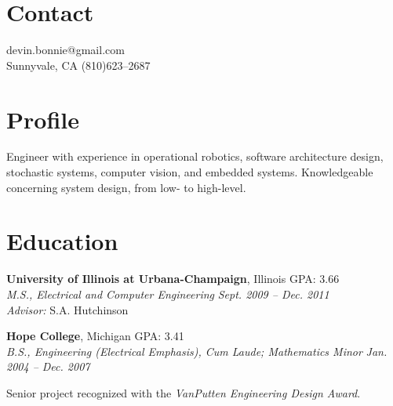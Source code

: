 \documentclass[margin, line]{resume}
\begin{document}
\begin{resume}
\vspace{-2mm}
    \section{\mysidestyle Contact}

			  \hfill devin.bonnie@gmail.com \\ \vspace{-2mm}%
	Sunnyvale, CA                           \hfill   (810)623--2687 \vspace{0mm}\vspace{-2mm}%
    \section{\mysidestyle Profile}
   
Engineer with experience in operational robotics, software architecture design, stochastic systems, computer vision, and embedded systems. Knowledgeable concerning system design, from low- to high-level.  \vspace{-4mm}
    \section{\mysidestyle Education}

    \textbf{University of Illinois at Urbana-Champaign}, Illinois  \hfill GPA: 3.66 \vspace{0mm}\\%
    \textsl{M.S., Electrical and Computer Engineering} \hfill \textsl{Sept. 2009 -- Dec. 2011}\\
    \textsl{Advisor:} S.A. Hutchinson \vspace{-2mm} %

    \textbf{Hope College}, Michigan  \hfill GPA: 3.41\vspace{0mm}\\%
    \textsl{B.S., Engineering (Electrical Emphasis), Cum Laude; Mathematics Minor} \hfill \textsl{Jan. 2004 -- Dec. 2007}\vspace{-3mm}\\\vspace{-1mm}%
    \begin{list2}
        \item Senior project recognized with the \textit{VanPutten Engineering Design Award}.
    \end{list2}\vspace{-2mm}


\end{resume}
\end{document}
